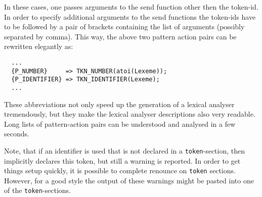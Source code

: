 In these cases, one passes arguments to the send function other then the
token-id. In order to specify additional arguments to the send functions the
token-ids have to be followed by a pair of brackets containing the list of
arguments (possibly separated by comma). This way, the above two pattern
action pairs can be rewritten elegantly as:

\begin{lstlisting}
  ...
  {P_NUMBER}     => TKN_NUMBER(atoi(Lexeme));
  {P_IDENTIFIER} => TKN_IDENTIFIER(Lexeme); 
  ...
\end{lstlisting}

These abbreviations not only speed up the generation of a lexical analyser
tremendously, but they make the lexical analyser descriptions also very
readable. Long lists of pattern-action pairs can be understood and
analysed in a few seconds.

Note, that if an identifier is used that is not declared in a {\tt token}-section, 
    then {\quex} implicitly declares this token, but still a warning is reported.
In order to get things setup quickly, it is possible to complete renounce on
{\tt token} sections. However, for a good style the output of these warnings
might be pasted into one of the {\tt token}-sections.
